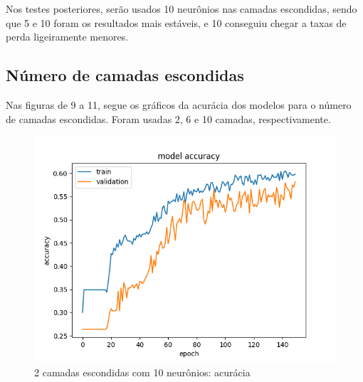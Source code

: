\documentclass[11pt]{article}
\begin{document}
Nos testes posteriores, serão usados 10 neurônios nas camadas escondidas, sendo que 5 e 10 foram os resultados mais estáveis, e 10 conseguiu chegar a taxas de perda ligeiramente menores.

\subsection*{Número de camadas escondidas}

Nas figuras de 9 a 11, segue os gráficos da acurácia dos modelos para o número de camadas escondidas. Foram usadas 2, 6 e 10 camadas, respectivamente.

\begin{figure}
	\includegraphics[width=\linewidth]{exp/Figure_5.png}
	\caption{2 camadas escondidas com 10 neurônios: acurácia}
	\label{fig:f4}
\end{figure}
\end{document}
